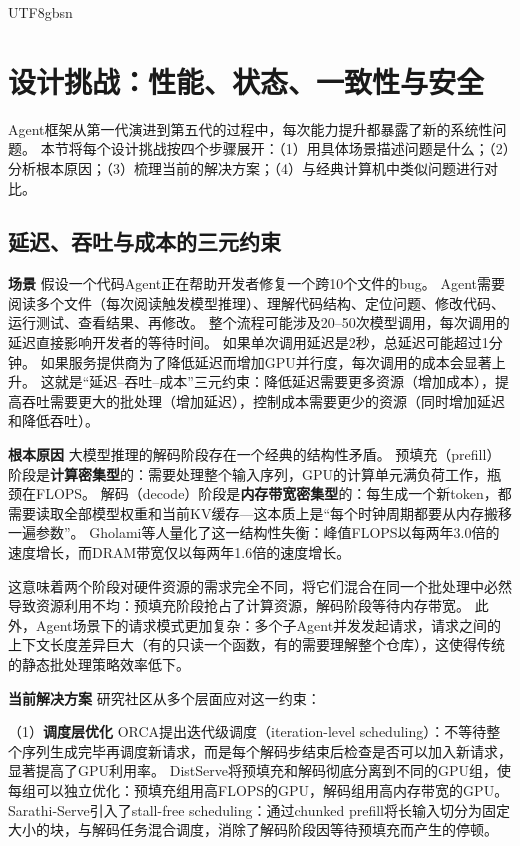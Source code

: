 \documentclass[11pt,a4paper]{article}
\begin{document}
\begin{CJK*}{UTF8}{gbsn}
\section{设计挑战：性能、状态、一致性与安全}
\label{sec:challenges}

Agent框架从第一代演进到第五代的过程中，每次能力提升都暴露了新的系统性问题。
本节将每个设计挑战按四个步骤展开：（1）用具体场景描述问题是什么；（2）分析根本原因；（3）梳理当前的解决方案；（4）与经典计算机中类似问题进行对比。

\subsection{延迟、吞吐与成本的三元约束}

\textbf{场景}
假设一个代码Agent正在帮助开发者修复一个跨10个文件的bug。
Agent需要阅读多个文件（每次阅读触发模型推理）、理解代码结构、定位问题、修改代码、运行测试、查看结果、再修改。
整个流程可能涉及20--50次模型调用，每次调用的延迟直接影响开发者的等待时间。
如果单次调用延迟是2秒，总延迟可能超过1分钟。
如果服务提供商为了降低延迟而增加GPU并行度，每次调用的成本会显著上升。
这就是``延迟--吞吐--成本''三元约束：降低延迟需要更多资源（增加成本），提高吞吐需要更大的批处理（增加延迟），控制成本需要更少的资源（同时增加延迟和降低吞吐）。

\textbf{根本原因}
大模型推理的解码阶段存在一个经典的结构性矛盾。
预填充（prefill）阶段是\textbf{计算密集型}的：需要处理整个输入序列，GPU的计算单元满负荷工作，瓶颈在FLOPS。
解码（decode）阶段是\textbf{内存带宽密集型}的：每生成一个新token，都需要读取全部模型权重和当前KV缓存---这本质上是``每个时钟周期都要从内存搬移一遍参数''\cite{gholami2024memorywall}。
Gholami等人量化了这一结构性失衡：峰值FLOPS以每两年3.0倍的速度增长，而DRAM带宽仅以每两年1.6倍的速度增长\cite{gholami2024memorywall}。

这意味着两个阶段对硬件资源的需求完全不同，将它们混合在同一个批处理中必然导致资源利用不均：预填充阶段抢占了计算资源，解码阶段等待内存带宽。
此外，Agent场景下的请求模式更加复杂：多个子Agent并发发起请求，请求之间的上下文长度差异巨大（有的只读一个函数，有的需要理解整个仓库），这使得传统的静态批处理策略效率低下。

\textbf{当前解决方案}
研究社区从多个层面应对这一约束：

（1）\textbf{调度层优化}
ORCA\cite{orca2022}提出迭代级调度（iteration-level scheduling）：不等待整个序列生成完毕再调度新请求，而是每个解码步结束后检查是否可以加入新请求，显著提高了GPU利用率。
DistServe\cite{zhong2024distserve}将预填充和解码彻底分离到不同的GPU组，使每组可以独立优化：预填充组用高FLOPS的GPU，解码组用高内存带宽的GPU。
Sarathi-Serve\cite{agrawal2024sarathi}引入了stall-free scheduling：通过chunked prefill将长输入切分为固定大小的块，与解码任务混合调度，消除了解码阶段因等待预填充而产生的停顿。


\end{CJK*}
\end{document}

